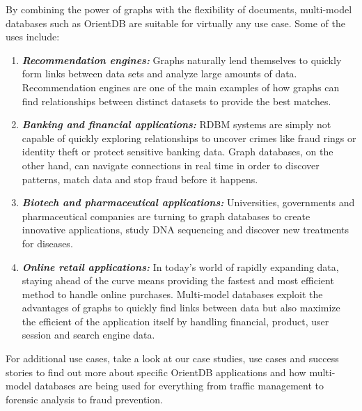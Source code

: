\documentclass[
	final,
	a4paper,
	oneside,
	parskip=half,
	headings=standardclasses,
	headings=big,
	pointednumbers,
    fleqn
]{scrartcl}
\newcommand{\brand}[1]{\textbf{\textit{#1}}}
\begin{document}
\begin{multicols*}{2}
            By combining the power of graphs with the flexibility of documents, multi-model databases such as OrientDB are suitable for virtually any use case. Some of the uses include:
            
            \begin{enumerate}
                \item{
                    \brand{Recommendation engines:} Graphs naturally lend themselves to quickly form links between data sets and analyze large amounts of data. Recommendation engines are one of the main examples of how graphs can find relationships between distinct datasets to provide the best matches.
                }
                \item{
                    \brand{Banking and financial applications:} RDBM systems are simply not capable of quickly exploring relationships to uncover crimes like fraud rings or identity theft or protect sensitive banking data. Graph databases, on the other hand, can navigate connections in real time in order to discover patterns, match data and stop fraud before it happens.
                }
                \item{
                    \brand{Biotech and pharmaceutical applications:} Universities, governments and pharmaceutical companies are turning to graph databases to create innovative applications, study DNA sequencing and discover new treatments for diseases.
                }
                \item{
                    \brand{Online retail applications:} In today’s world of rapidly expanding data, staying ahead of the curve means providing the fastest and most efficient method to handle online purchases. Multi-model databases exploit the advantages of graphs to quickly find links between data but also maximize the efficient of the application itself by handling financial, product, user session and search engine data.
                }
            \end{enumerate}
            
            For additional use cases, take a look at our case studies, use cases and success stories to find out more about specific OrientDB applications and how multi-model databases are being used for everything from traffic management to forensic analysis to fraud prevention.

            
            
            


\end{multicols*}
 
\end{document}
